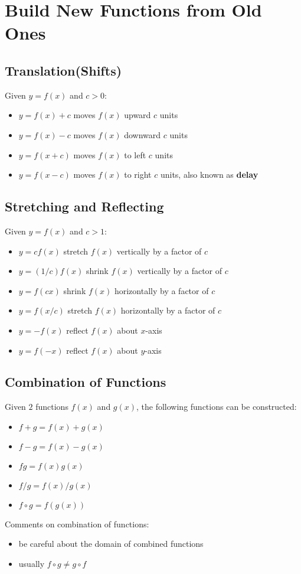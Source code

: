 \documentclass[10pt,a4paper,oneside]{article}
\begin{document}
\section{Build New Functions from Old Ones}

\subsection{Translation(Shifts)}
Given $y = f(x)$ and $c > 0$:
\begin{itemize}
	\item $y = f(x) + c$ moves $f(x)$ upward $c$ units
	\item $y = f(x) - c$ moves $f(x)$ downward $c$ units
	\item $y = f(x + c)$ moves $f(x)$ to left $c$ units
	\item $y = f(x - c)$ moves $f(x)$ to right $c$ units, also known as \textbf{delay}
\end{itemize}

\subsection{Stretching and Reflecting}
Given $y = f(x)$ and $c > 1$:
\begin{itemize}
	\item $y = c f(x)$ stretch $f(x)$ vertically by a factor of $c$
	\item $y = (1/c) f(x)$ shrink $f(x)$ vertically by a factor of $c$
	\item $y = f(cx)$ shrink $f(x)$ horizontally by a factor of $c$
	\item $y = f(x/c)$ stretch $f(x)$ horizontally by a factor of $c$
	\item $y = -f(x)$ reflect $f(x)$ about $x$-axis
	\item $y = f(-x)$ reflect $f(x)$ about $y$-axis
\end{itemize}

\subsection{Combination of Functions}
Given $2$ functions $f(x)$ and $g(x)$, the following functions can be constructed:
\begin{itemize}
	\item $f + g = f(x) + g(x)$
	\item $f - g = f(x) - g(x)$
	\item $fg = f(x) g(x)$
	\item $f/g = f(x)/g(x)$
	\item $f \circ g = f(g(x))$
\end{itemize}
Comments on combination of functions:
\begin{itemize}
	\item be careful about the domain of combined functions
	\item usually $f\circ g \neq g\circ f$
\end{itemize}
\end{document}
